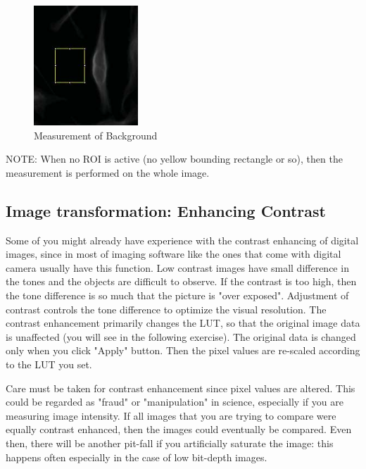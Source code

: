 \begin{indentexercise}{1}
\begin{figure}[htbp]
\begin{center}
\includegraphics[height=4.5cm]{fig/CMCIBasicCourse201102-img35.jpg}
\caption{Measurement of Background}
\label{fig:img35}
\end{center}
\end{figure}

\end{indentexercise}

NOTE: When no ROI is active (no yellow bounding rectangle or so),
then the measurement is performed on the whole image.

\subsection{Image transformation: Enhancing Contrast}
\label{subsec:enhancecontrast}
Some of you might already have experience with the contrast enhancing of
digital images, since in most of imaging software like the ones that
come with digital camera usually have this function. Low contrast images
have small difference in the tones and the objects are difficult to observe.
If the contrast is too high, then the tone difference is so much that
the picture is "over exposed".
Adjustment of contrast controls the tone difference to optimize the
visual resolution. The contrast enhancement primarily changes the LUT,
so that the original image data is unaffected (you will see in the
following exercise). The original data is changed only when you click
"Apply" button. Then the pixel values
are re-scaled according to the LUT you set.



Care must be taken for contrast enhancement since pixel values are
altered. This could be regarded as
"fraud" or
"manipulation" in science, especially if
you are measuring image intensity. If all images that you are trying to
compare were equally contrast enhanced,
then the images could eventually be compared. Even then, there will be another
pit-fall if you artificially saturate the image: this happens often
especially in the case of low bit-depth images. 


